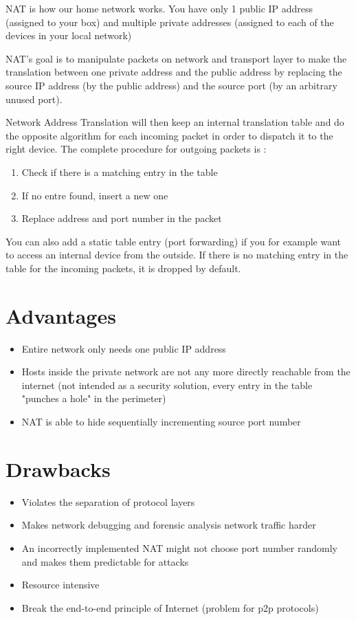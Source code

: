 NAT is how our home network works. You have only 1 public IP address (assigned to your box) and multiple private addresses (assigned to each of the devices in your local network)

NAT's goal is to manipulate packets on network and transport layer to make the translation between one private address and the public address by replacing the source IP address (by the public address) and the source port (by an arbitrary unused port).

Network Address Translation will then keep an internal translation table and do the opposite algorithm for each incoming packet in order to dispatch it to the right device. The complete procedure for outgoing packets is :
\begin{enumerate}
    \item Check if there is a matching entry in the table
    \item If no entre found, insert a new one
    \item Replace address and port number in the packet
\end{enumerate}

You can also add a static table entry (port forwarding) if you for example want to access an internal device from the outside. If there is no matching entry in the table for the incoming packets, it is dropped by default.

\section{Advantages}
\begin{itemize}
    \item Entire network only needs one public IP address
    \item Hosts inside the private network are not any more directly reachable from the internet (not intended as a security solution, every entry in the table "punches a hole" in the perimeter)
    \item NAT is able to hide sequentially incrementing source port number
\end{itemize}

\section{Drawbacks}
\begin{itemize}
    \item Violates the separation of protocol layers
    \item Makes network debugging and forensic analysis network traffic harder
    \item An incorrectly implemented NAT might not choose port number randomly and makes them predictable for attacks
    \item Resource intensive
    \item Break the end-to-end principle of Internet (problem for p2p protocols)
\end{itemize}

